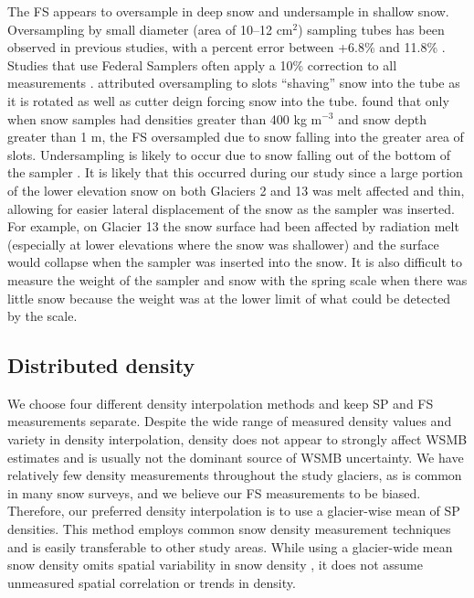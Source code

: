 \documentclass[twocolumn,letterpaper]{igs}
\begin{document}
The FS appears to oversample in deep snow and undersample in shallow snow. Oversampling by small diameter (area of 10--12 cm$^2$) sampling tubes has been observed in previous studies, with a percent error between +6.8\% and 11.8\% \citep{Work1965, Fames1982, Conger2009}. Studies that use Federal Samplers often apply a 10\% correction to all measurements \citep[e.g.][]{Molotch2005}. \cite{Dixon2012} attributed oversampling to slots ``shaving'' snow into the tube as it is rotated as well as cutter deign forcing snow into the tube. \cite{Beaumont1963} found that only when snow samples had densities greater than 400 kg m$^{-3}$ and snow depth greater than 1 m, the FS oversampled due to snow falling into the greater area of slots. Undersampling is likely to occur due to snow falling out of the bottom of the sampler \citep{Turcan1975}. It is likely that this occurred during our study since a large portion of the lower elevation snow on both Glaciers 2 and 13 was melt affected and thin, allowing for easier lateral displacement of the snow as the sampler was inserted. For example, on Glacier 13 the snow surface had been affected by radiation melt (especially at lower elevations where the snow was shallower) and the surface would collapse when the sampler was inserted into the snow. It is also difficult to measure the weight of the sampler and snow with the spring scale when there was little snow because the weight was at the lower limit of what could be detected by the scale.

\subsection{Distributed density}

We choose four different density interpolation methods and keep SP and FS measurements separate. Despite the wide range of measured density values and variety in density interpolation, density does not appear to strongly affect WSMB estimates and is usually not the dominant source of WSMB uncertainty. We have relatively few density measurements throughout the study glaciers, as is common in many snow surveys, and we believe our FS measurements to be biased. Therefore, our preferred density interpolation is to use a glacier-wise mean of SP densities. This method employs common snow density measurement techniques and is easily transferable to other study areas. While using a glacier-wide mean snow density omits spatial variability in snow density \citep{Wetlaufer2016}, it does not assume unmeasured spatial correlation or trends in density.
\end{document}
